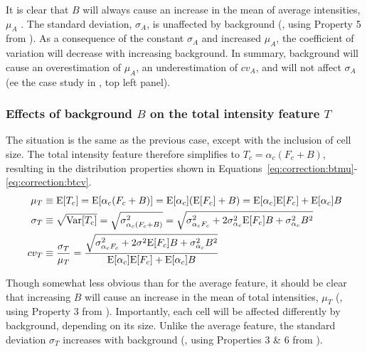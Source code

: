 It is clear that $B$ will always cause
an increase in the mean of average intensities, $\mu_A$ .
The standard deviation, $\sigma_A$, is
unaffected by background (, using Property 5 from ).
As a consequence of the
constant $\sigma_A$ and increased $\mu_A$, the coefficient of variation
will decrease with increasing background. In summary, background will cause
an overestimation of $\mu_A$, an underestimation of $cv_A$, and will not affect
$\sigma_A$ (ee the case study in , top left panel).


\subsubsection{Effects of background $B$ on the total intensity feature $T$}


The situation is the same as the previous case,
except with the inclusion of cell size.
The total intensity feature 
therefore simplifies to $T_c=\alpha_c (F_c+B)$,
resulting in the distribution properties shown in 
Equations~\ref{eq:correction:btmu}\nobreakdash-\ref{eq:correction:btcv}.
    \begin{align}
    \mu_T    & \equiv \mathrm{E}[T_c] = \mathrm{E}[\alpha_c(F_c+B)]=\mathrm{E}[\alpha_c](\mathrm{E}[F_c]+B) =
        \mathrm{E}[\alpha_c]\mathrm{E}[F_c]+\mathrm{E}[\alpha_c]B
        \label{eq:correction:btmu}\\
    \sigma_T & \equiv \sqrt{\mathrm{Var}[T_c]} = \sqrt{\sigma^2_{\alpha_c(F_c+B)}} =
        \sqrt{\sigma^2_{\alpha_c F_c} + 2\sigma^2_{\alpha_c}\mathrm{E}[F_c]B
        + \sigma^2_{\alpha_c}B^2}
        \label{eq:correction:btsd}\\
    cv_T     & \equiv \frac{\sigma_T}{\mu_T} =
        \frac{ \sqrt{\sigma^2_{\alpha_c F_c}+2\sigma^2\mathrm{E}[F_c]B+ \sigma^2_{\alpha_c}B^2 } }
        { \mathrm{E}[\alpha_c]\mathrm{E}[F_c] + \mathrm{E}[\alpha_c]B }
        \label{eq:correction:btcv}
    \end{align}

    
Though somewhat less obvious than for the average feature,
it should be clear that increasing $B$ will cause
an increase in the mean of total intensities, $\mu_T$
(, using Property
3 from ). Importantly,
each cell will be affected differently by background, depending on its size.
Unlike the average feature, the standard deviation $\sigma_T$
increases with background (,
using Properties 3 \& 6 from ).


